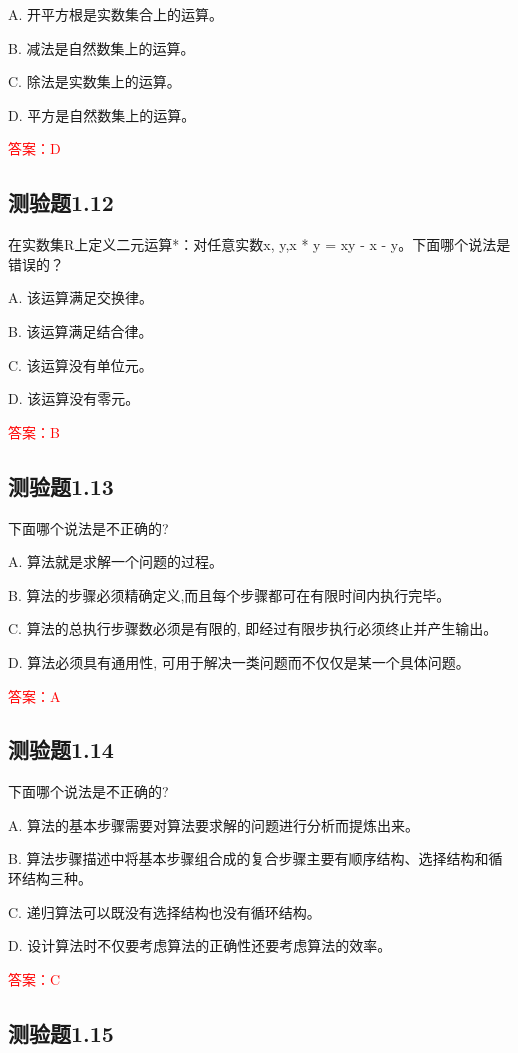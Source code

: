 \documentclass[UTF8, heading=true]{ctexart}
\begin{document}
A. 开平方根是实数集合上的运算。

B. 减法是自然数集上的运算。

C. 除法是实数集上的运算。

D. 平方是自然数集上的运算。

\textcolor{red}{答案：D}

\subsection{测验题1.12}

在实数集R上定义二元运算*：对任意实数x, y,x * y = xy - x - y。下面哪个说法是错误的？

A. 该运算满足交换律。

B. 该运算满足结合律。

C. 该运算没有单位元。

D. 该运算没有零元。

\textcolor{red}{答案：B}

\subsection{测验题1.13}

下面哪个说法是不正确的?

A. 算法就是求解一个问题的过程。

B. 算法的步骤必须精确定义,而且每个步骤都可在有限时间内执行完毕。

C. 算法的总执行步骤数必须是有限的, 即经过有限步执行必须终止并产生输出。

D. 算法必须具有通用性, 可用于解决一类问题而不仅仅是某一个具体问题。

\textcolor{red}{答案：A}

\subsection{测验题1.14}

下面哪个说法是不正确的?

A. 算法的基本步骤需要对算法要求解的问题进行分析而提炼出来。

B. 算法步骤描述中将基本步骤组合成的复合步骤主要有顺序结构、选择结构和循环结构三种。

C. 递归算法可以既没有选择结构也没有循环结构。

D. 设计算法时不仅要考虑算法的正确性还要考虑算法的效率。

\textcolor{red}{答案：C}

\subsection{测验题1.15}
\end{document}
